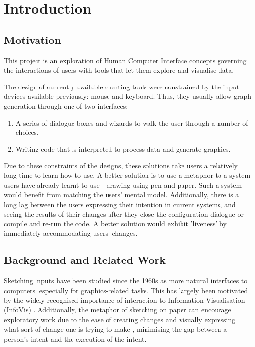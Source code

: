 \chapter{Introduction}
\section{Motivation}
This project is an exploration of Human Computer Interface concepts governing the interactions of users with tools that let them explore and visualise data.

The design of currently available charting tools were constrained by the input devices available previously: mouse and keyboard. Thus, they usually allow graph generation through one of two interfaces:
\begin{enumerate}
\item A series of dialogue boxes and wizards to walk the user through a number of choices.
\item Writing code that is interpreted to process data and generate graphics.
\end{enumerate}

Due to these constraints of the designs, these solutions take users a relatively long time to learn how to use. A better solution is to use a metaphor to a system users have already learnt to use - drawing using pen and paper. Such a system would benefit from matching the users' mental model. Additionally, there is a long lag between the users expressing their intention in current systems, and seeing the results of their changes after they close the configuration dialogue or compile and re-run the code. A better solution would exhibit 'liveness' by immediately accommodating users' changes.

\section{Background and Related Work}
Sketching inputs have been studied since the 1960s \citep{Sutherland1964} as more natural interfaces to computers, especially for graphics-related tasks. This has largely been motivated by the widely recognised importance of interaction to Information Visualisation (InfoVis) \citep{Lee2012}. Additionally, the metaphor of sketching on paper can encourage exploratory work due to the ease of creating changes and visually expressing what sort of change one is trying to make \citep{Citation Needed}, minimising the gap between a person's intent and the execution of the intent.

